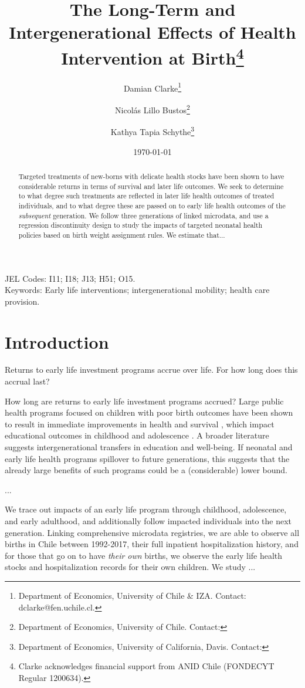 \documentclass[11pt]{article}
\title{The Long-Term and Intergenerational Effects of Health Intervention at Birth\thanks{Clarke acknowledges financial support from ANID Chile (FONDECYT Regular 1200634).}}
\author{Damian Clarke\thanks{Department of Economics, University of Chile \& IZA.  Contact: dclarke@fen.uchile.cl.}
  \and Nicol\'as Lillo Bustos\thanks{Department of Economics, University of Chile.  Contact:}
  \and Kathya Tapia Schythe\thanks{Department of Economics, University of California, Davis.  Contact:}
}
\date{\today}
\begin{document}
\begin{spacing}{1.5}
  \maketitle

  \begin{abstract}
    Targeted treatments of new-borns with delicate health stocks have been shown to have considerable returns in terms of survival and later life outcomes.  We seek to determine to what degree such treatments are reflected in later life health outcomes of treated individuals, and to what degree these are passed on to early life health outcomes of the \emph{subsequent} generation.  We follow three generations of linked microdata, and use a regression discontinuity design to study the impacts of targeted neonatal health policies based on birth weight assignment rules.  We estimate that...
  \end{abstract}

  \noindent JEL Codes: I11; I18; J13; H51; O15. \\
  Keywords: Early life interventions; intergenerational mobility; health care provision. \\

  \clearpage

  \section{Introduction}
  Returns to early life investment programs accrue over life.  For how long does this accrual last?  

  

  How long are returns to early life investment programs accrued?  Large public health programs focused on children with poor birth outcomes have been shown to result in immediate improvements in health and survival \citep{Almondetal2010}, which impact educational outcomes in childhood and adolescence \citep{Bharadwajetal2013}.  A broader literature suggests intergenerational transfers in education and well-being.  If neonatal and early life health programs spillover to future generations, this suggests that the already large benefits of such programs could be a (considerable) lower bound.


  ...
  
  We trace out impacts of an early life program through childhood, adolescence, and early adulthood, and additionally follow impacted individuals into the next generation.  Linking comprehensive microdata registries, we are able to observe all births in Chile between 1992-2017, their full inpatient hospitalization history, and for those that go on to have \emph{their own} births, we observe the early life health stocks and hospitalization records for their own children.  We study ...


\end{spacing}
\end{document}
